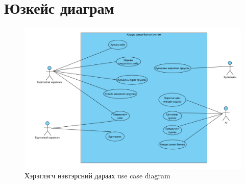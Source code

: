 \section{Юзкейс диаграм}
\begin{figure}[H]
    \centering
    \caption{Хэрэглэгч нэвтэрсний дараах use case diagram }
    \includegraphics[width=\textwidth]{figures/Usecase.png}
    
    \label{fig:sudalgaa}
\end{figure}

\newpage
